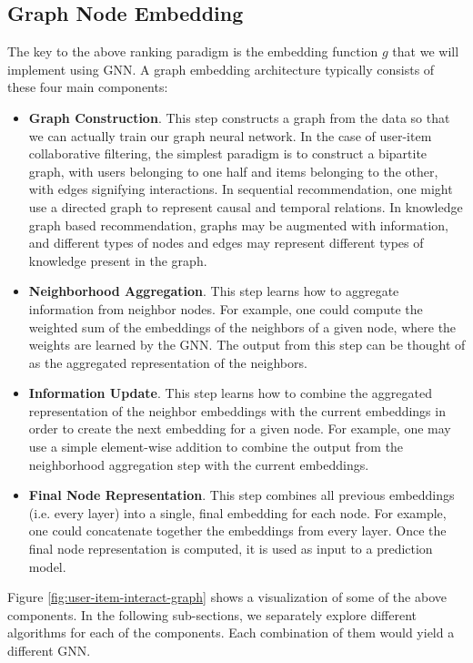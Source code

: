 \documentclass{article}
\begin{document}
\subsection{Graph Node Embedding} \label{gnn-paradigm}

The key to the above ranking paradigm is the embedding function $g$ that we will implement using GNN. A graph embedding architecture typically consists of these four main components:

\begin{itemize}
    \item \textbf{Graph Construction}. This step constructs a graph from the data so that we can actually train our graph neural network. In the case of user-item collaborative filtering, the simplest paradigm is to construct a bipartite graph, with users belonging to one half and items belonging to the other, with edges signifying interactions. In sequential recommendation, one might use a directed graph to represent causal and temporal relations. In knowledge graph based recommendation, graphs may be augmented with information, and different types of nodes and edges may represent different types of knowledge present in the graph.
    \item \textbf{Neighborhood Aggregation}. This step learns how to aggregate information from neighbor nodes. For example, one could compute the weighted sum of the embeddings of the neighbors of a given node, where the weights are learned by the GNN. The output from this step can be thought of as the aggregated representation of the neighbors.
    \item \textbf{Information Update}. This step learns how to combine the aggregated representation of the neighbor embeddings with the current embeddings in order to create the next embedding for a given node. For example, one may use a simple element-wise addition to combine the output from the neighborhood aggregation step with the current embeddings.
    \item \textbf{Final Node Representation}. This step combines all previous embeddings (i.e. every layer) into a single, final embedding for each node. For example, one could concatenate together the embeddings from every layer. Once the final node representation is computed, it is used as input to a prediction model.
\end{itemize}

Figure \ref{fig:user-item-interact-graph} shows a visualization of some of the above components. In the following sub-sections, we separately explore different algorithms for each of the components. Each combination of them would yield a different GNN. 
\end{document}
